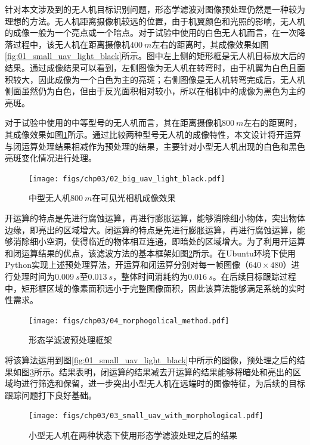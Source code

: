 针对本文涉及到的无人机目标识别问题，形态学滤波对图像预处理仍然是一种较为理想的方法。无人机距离摄像机较远的位置，由于机翼颜色和光照的影响，无人机的成像一般为一个亮点或一个暗点。对于试验中使用的白色无人机而言，在一次降落过程中，该无人机在距离摄像机$400\ m$左右的距离时，其成像效果如图\ref{fig:01_small_uav_light_black}所示。图中左上侧的矩形框是无人机目标放大后的结果。通过成像结果可以看到，左侧图像为无人机在转弯时，由于机翼为白色且面积较大，因此成像为一个白色为主的亮斑；右侧图像是无人机转弯完成后，无人机侧面虽然仍为白色，但由于反光面积相对较小，所以在相机中的成像为黑色为主的亮斑。


对于试验中使用的中等型号的无人机而言，其在距离摄像机$800\ m$左右的距离时，其成像效果如图\ref{fig:02_big_uav_light_black}所示。通过比较两种型号无人机的成像特性，本文设计将开运算与闭运算处理结果相减作为预处理的结果，主要针对小型无人机出现的白色和黑色亮斑变化情况进行处理。

\begin{figure}[ht]   
	\centering
	\texttt{[image: figs/chp03/02\_big\_uav\_light\_black.pdf]}
	\caption{中型无人机$800\ m$在可见光相机成像效果}
	\label{fig:02_big_uav_light_black}
\end{figure}

开运算的特点是先进行腐蚀运算，再进行膨胀运算，能够消除细小物体，突出物体边缘，即亮出的区域增大。闭运算的特点是先进行膨胀运算，再进行腐蚀运算，能够消除细小空洞，使得临近的物体相互连通，即暗处的区域增大。为了利用开运算和闭运算结果的优点，该滤波方法的基本框架如图\ref{fig:04_morphogolical_method}所示。在Ubuntu环境下使用Python实现上述预处理算法，开运算和闭运算分别对每一帧图像（$640 \times 480$）进行处理时间为$0.009\ s$至$0.013\ s$，整体时间消耗约为$0.016\ s$。在后续目标跟踪过程中，矩形框区域的像素面积远小于完整图像面积，因此该算法能够满足系统的实时性需求。

\begin{figure}[ht]   
	\centering
	\texttt{[image: figs/chp03/04\_morphogolical\_method.pdf]}
	\caption{形态学滤波预处理框架}
	\label{fig:04_morphogolical_method}
\end{figure}

将该算法运用到图\ref{fig:01_small_uav_light_black}中所示的图像，预处理之后的结果如图\ref{fig:03_small_uav_with_morphological}所示。结果表明，闭运算的结果减去开运算的结果能够将暗处和亮出的区域均进行筛选和保留，进一步突出小型无人机在远端时的图像特征，为后续的目标跟踪问题打下良好基础。

\begin{figure}[ht]   
	\centering
	\texttt{[image: figs/chp03/03\_small\_uav\_with\_morphological.pdf]}
	\caption{小型无人机在两种状态下使用形态学滤波处理之后的结果}
	\label{fig:03_small_uav_with_morphological}
\end{figure}


